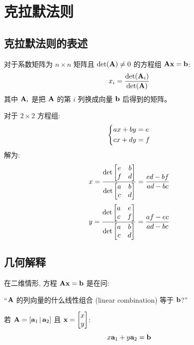 
\chapter{克拉默法则}
\label{ch:cramer}

\begin{abstract}
克拉默法则 (Cramer's Rule) 是一种用行列式求解线性方程组的优雅方法。在本章中, 我们将学习它的几何解释及其使用条件。
\end{abstract}

\section{克拉默法则的表述}

\begin{theorem}[克拉默法则]
对于系数矩阵为 $n \times n$ 矩阵且 $\det(\mathbf{A}) \neq 0$ 的方程组 $\mathbf{A}\mathbf{x} = \mathbf{b}$:
\[
x_i = \frac{\det(\mathbf{A}_i)}{\det(\mathbf{A})}
\]
其中 $\mathbf{A}_i$ 是把 $\mathbf{A}$ 的第 $i$ 列换成向量 $\mathbf{b}$ 后得到的矩阵。
\end{theorem}

\begin{example}
对于 $2 \times 2$ 方程组:
\[
\left\{\begin{aligned} 
ax + by &= e \\
cx + dy &= f
 \end{aligned}\right.
\]
解为:
\[
x = \frac{\det\begin{bmatrix} e & b \\ f & d \end{bmatrix}}{\det\begin{bmatrix} a & b \\ c & d \end{bmatrix}} = \frac{ed - bf}{ad - bc}
\]
\[
y = \frac{\det\begin{bmatrix} a & e \\ c & f \end{bmatrix}}{\det\begin{bmatrix} a & b \\ c & d \end{bmatrix}} = \frac{af - ec}{ad - bc}
\]
\end{example}

\section{几何解释}

\begin{intuition}
在二维情形, 方程 $\mathbf{A}\mathbf{x} = \mathbf{b}$ 是在问:

``$\mathbf{A}$ 的列向量的什么线性组合 (linear combination) 等于 $\mathbf{b}$?''

若 $\mathbf{A} = [\mathbf{a}_1 \,|\, \mathbf{a}_2]$ 且 $\mathbf{x} = \begin{bmatrix} x \\ y \end{bmatrix}$:
\[
x\mathbf{a}_1 + y\mathbf{a}_2 = \mathbf{b}
\]
\end{intuition}

